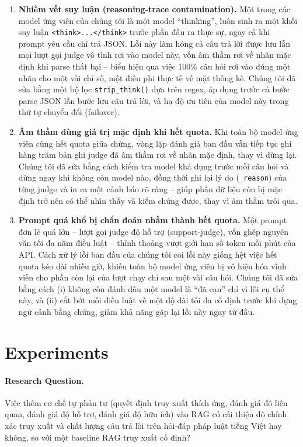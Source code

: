\documentclass[11pt]{article}
\begin{document}
\begin{enumerate}[leftmargin=*]
\item \textbf{Nhiễm vết suy luận (reasoning-trace contamination).} Một trong các model ứng viên của chúng tôi là một model ``thinking'', luôn sinh ra một khối suy luận \texttt{<think>...</think>} trước phần đầu ra thực sự, ngay cả khi prompt yêu cầu chỉ trả JSON. Lỗi này làm hỏng cả câu trả lời được lưu lẫn mọi lượt gọi judge vô tình rơi vào model này, vốn âm thầm rơi về nhãn mặc định khi parse thất bại -- biểu hiện qua việc 100\% câu hỏi rơi vào đúng một nhãn cho một vài chỉ số, một điều phi thực tế về mặt thống kê. Chúng tôi đã sửa bằng một bộ lọc \texttt{strip\_think()} dựa trên regex, áp dụng trước cả bước parse JSON lẫn bước lưu câu trả lời, và hạ độ ưu tiên của model này trong thứ tự chuyển đổi (failover).
\item \textbf{Âm thầm dùng giá trị mặc định khi hết quota.} Khi toàn bộ model ứng viên cùng hết quota giữa chừng, vòng lặp đánh giá ban đầu vẫn tiếp tục ghi hàng trăm bản ghi judge đã âm thầm rơi về nhãn mặc định, thay vì dừng lại. Chúng tôi đã sửa bằng cách kiểm tra model khả dụng trước mỗi câu hỏi và dừng ngay khi không còn model nào, đồng thời ghi lại lý do (\texttt{\_reason}) của từng judge và in ra một cảnh báo rõ ràng -- giúp phần dữ liệu còn bị mặc định trở nên có thể nhìn thấy và kiểm chứng được, thay vì âm thầm trôi qua.
\item \textbf{Prompt quá khổ bị chẩn đoán nhầm thành hết quota.} Một prompt đơn lẻ quá lớn -- lượt gọi judge độ hỗ trợ (support-judge), vốn ghép nguyên văn tối đa năm điều luật -- thỉnh thoảng vượt giới hạn số token mỗi phút của API. Cách xử lý lỗi ban đầu của chúng tôi coi lỗi này giống hệt việc hết quota kéo dài nhiều giờ, khiến toàn bộ model ứng viên bị vô hiệu hóa vĩnh viễn cho phần còn lại của lượt chạy chỉ sau một vài câu hỏi. Chúng tôi đã sửa bằng cách (i) không còn đánh dấu một model là ``đã cạn'' chỉ vì lỗi cụ thể này, và (ii) cắt bớt mỗi điều luật về một độ dài tối đa cố định trước khi dựng ngữ cảnh bằng chứng, giảm khả năng gặp lại lỗi này ngay từ đầu.
\end{enumerate}

\section{Experiments}
\label{sec:experiments}

\paragraph{Research Question.} Việc thêm cơ chế tự phản tư (quyết định truy xuất thích ứng, đánh giá độ liên quan, đánh giá độ hỗ trợ, đánh giá độ hữu ích) vào RAG có cải thiện độ chính xác truy xuất và chất lượng câu trả lời trên hỏi-đáp pháp luật tiếng Việt hay không, so với một baseline RAG truy xuất cố định?
\end{document}
